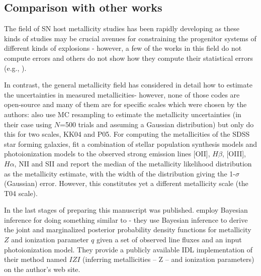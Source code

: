 \documentclass{emulateapj}
\begin{document}
\subsection{Comparison with other works}



The field of SN host metallicity studies has been rapidly developing as these kinds of studies may be crucial avenues for constraining the progenitor systems of different kinds of explosions - however, a few of the works in this field do not compute errors and others do not show how they compute their statistical errors  (e.g., \citealt{anderson10,leloudas11,sanders12,leloudas14}). %

In contrast, the general metallicity field has considered in detail how to estimate the uncertainties in measured metallicities- however, none of those codes are open-source and many of them are for specific scales which were chosen by the authors:  \citet{moustakas10} also use MC resampling to estimate the metallicity uncertainties (in their case using $N$=500 trials and assuming a Gaussian distribution) but only do this for two scales, KK04 and P05. For computing the metallicities of the SDSS star forming galaxies, \citet{tremonti04} fit a combination of stellar population synthesis models and  photoionization models to the observed strong emission lines [OII], $H\beta$, [OIII], $H\alpha$, NII and SII and report the median of the metallicity likelihood distribution as the metallicity estimate, with the width of the distribution giving the 1-$\sigma$ (Gaussian) error. However, this constitutes yet a different metallicity scale (the T04 scale).

In the last stages of preparing this manuscript \citet{blanc15} was published.  \citet{blanc15} employ Bayesian inference for doing something similar to \citet{tremonti04} - they use Bayesian inference to derive the joint and marginalized posterior probability density functions for metallicity $Z$ and ionization parameter $q$ given a set of observed line fluxes and an input photoionization model. They provide a publicly available IDL implementation of their method named $IZI$ (inferring metallicities -- Z -- and ionization parameters) on the author's web site.
\end{document}
